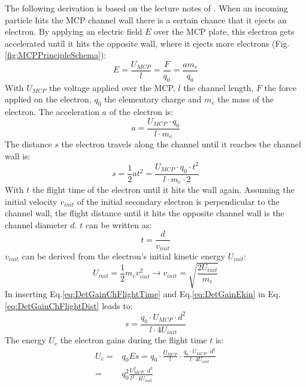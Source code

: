		The following derivation is based on the lecture notes of \cite{LecNot_Wurz2017}. When an incoming particle hits the MCP channel wall there is a certain chance that it ejects an electron. By applying an electric field $E$ over the MCP plate, this electron gets accelerated until it hits the opposite wall, where it ejects more electrons (Fig.\,\ref{fig:MCPPrincipleSchema}):
		\begin{equation}
			E = \frac{U_{MCP}}{l} = \frac{F}{q_0} = \frac{a m_e}{q_0}
		\end{equation}
		With $U_{MCP}$ the voltage applied over the MCP, $l$ the channel length, $F$ the force applied on the electron, $q_0$ the elementary charge and $m_e$ the mass of the electron. The acceleration $a$ of the electron is:		
		\begin{equation}
			a = \frac{U_{MCP}\cdot q_0}{l\cdot m_e}
		\end{equation}
		The distance $s$ the electron travels along the channel until it reaches the channel wall is:
		\begin{equation}
			s = \frac{1}{2}at^2 = \frac{U_{MCP}\cdot q_0\cdot t^2}{l\cdot m_e\cdot 2}
			\label{eq:DetGainChFlightDist}
		\end{equation}
		With $t$ the flight time of the electron until it hits the wall again. Assuming the initial velocity $v_{init}$ of the initial secondary electron is perpendicular to the channel wall, the flight distance until it hits the opposite channel wall is the channel diameter $d$. $t$ can be written as:
		\begin{equation}
			t = \frac{d}{v_{init}}
			\label{eq:DetGainChFlightTime}
		\end{equation}
		$v_{init}$ can be derived from the electron's initial kinetic energy $U_{init}$:
		\begin{equation}
			U_{init} = \frac{1}{2}m_e v_{init}^2 \rightarrow v_{init} = \sqrt{\frac{2U_{init}}{m_e}}
			\label{eq:DetGainEkin}
		\end{equation}
		In inserting Eq.\eqref{eq:DetGainChFlightTime} and Eq.\eqref{eq:DetGainEkin} in Eq.\eqref{eq:DetGainChFlightDist} leads to:
		\begin{equation}
			s = \frac{q_0 \cdot U_{MCP}\cdot d^2}{l\cdot 4U_{init}}
			\label{eq:DetGainDistECh}
		\end{equation}
		The energy $U_c$ the electron gains during the flight time $t$ is:
		\begin{align}
			U_c =& q_0 Es = q_0\cdot \frac{U_{MCP}}{l}\cdot\frac{q_0\cdot U_{MCP}\cdot d^2}{l\cdot 4 U_{init}}\\
			=& q_0^2 \frac{U_{MCP}^2\cdot d^2}{l^2\cdot 4U_{init}}
		\end{align}

